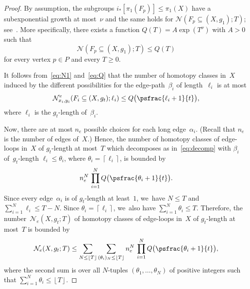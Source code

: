 \begin{proof}
By assumption, the subgroups $i_*[\pi_1(F_p)] \leqslant \pi_1(X)$ have a subexponential growth at most~$\nu$ and the same holds for $\mathcal{N}(F_p \subseteq (X,g_1);T)$; see~\cite{manning05}.
More specifically, there exists a function $Q(T)=A \exp(T^\nu)$ with $A>0$ such that\vspace*{-3pt}
\begin{equation} \label{eq:Q}
\mathcal{N}(F_p \subseteq (X,g_1);T) \leq Q(T)
\end{equation}
for every vertex $p \in P$ and every $T \geq 0$.

It follows from~\eqref{eq:N1} and~\eqref{eq:Q} that the number of homotopy classes in~$X$ induced by the different possibilities for the edge-path~$\beta_i$ of length~$\ell_i$ is at most\vspace*{-3pt}
\[
\mathcal{N}^e_{{x_i},{y_i}}(F_i \subseteq (X,g_t);\ell_i) \leq Q \bigl(\psfrac{\ell_i +1}{t} \bigr),
\]
where $\ell_i$ is the $g_t$-length of~$\beta_i$.

Now, there are at most $n_e$ possible choices for each long edge~$\alpha_i$.
(Recall that $n_e$ is the number of edges of~$X$.)
Hence, the number of homotopy classes of edge-loops in~$X$ of $g_t$-length at most~$T$ which decomposes as in~\eqref{eq:decomp} with $\beta_i$ of~$g_t$-length $\ell_i \leq \theta_i$, where $\theta_i = \left \lceil{\ell_i}\right \rceil$, is bounded by\vspace*{-5pt}
\[
n_e^N \, \prod_{i=1}^N Q \bigl(\psfrac{\theta_i +1}{t} \bigr).
\]
Since every edge~$\alpha_i$ is of $g_t$-length at least~$1$, we~have $N \leq T$ and $\sum_{i=1}^N \ell_i \leq T-N$.
Since $\theta_i = \left \lceil{\ell_i}\right \rceil$, we~also have $\sum_{i=1}^N \theta_i \leq T$.
Therefore, the number~$\mathcal{N}_e(X,g_t;T)$ of homotopy classes of edge-loops in~$X$ of $g_t$-length at most~$T$ is bounded by\vspace*{-3pt}
\begin{equation} \label{eq:double}
\mathcal{N}_e(X,g_t;T) \leq \sum_{N \leq \left \lfloor{T}\right \rfloor} \sum_{(\theta_i)_N \leq \left \lfloor{T}\right \rfloor} n_e^N \, \prod_{i=1}^N Q \bigl(\psfrac{\theta_i +1}{t} \bigr),
\end{equation}
where the second sum is over all $N$-tuples $(\theta_1,\dots,\theta_N)$ of positive integers such that \hbox{$\sum_{i=1}^N \theta_i \leq \left \lfloor{T}\right \rfloor$}.


\end{proof}
